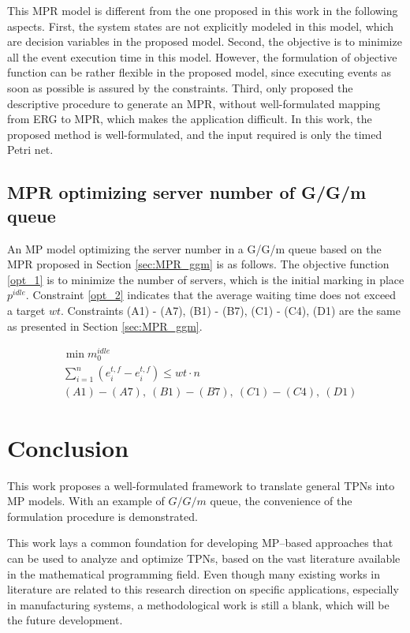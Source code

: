 \documentclass[suppldata]{interact}
\theoremstyle{plain}
\theoremstyle{definition}
\theoremstyle{remark}
\begin{document}
This MPR model is different from the one proposed in this work in the following aspects. First, the system states are not explicitly modeled in this model, which are decision variables in the proposed model. Second, the objective is to minimize all the event execution time in this model. However, the formulation of objective function can be rather flexible in the proposed model, since executing events as soon as possible is assured by the constraints. Third, \cite{chan2008optimization} only proposed the descriptive procedure to generate an MPR, without well-formulated mapping from ERG to MPR, which makes the application difficult. In this work, the proposed method is well-formulated, and the input required is only the timed Petri net.


\subsection{MPR optimizing server number of G/G/m queue}
An MP model optimizing the server number in a G/G/m queue based on the MPR proposed in Section \ref{sec:MPR_ggm} is as follows. The objective function \eqref{opt_1} is to minimize the number of servers, which is the initial marking in place $p^{idle}$. Constraint \eqref{opt_2} indicates that the average waiting time does not exceed a target $wt$. Constraints (A1) - (A7), (B1) - (B7), (C1) - (C4), (D1) are the same as presented in Section \ref{sec:MPR_ggm}.

\begin{eqnarray}
	&\min{m^{idle}_0} \label{opt_1} \\
	&\sum_{i=1}^{n} (e^{t,f}_i-e^{t,f}_i) \le wt\cdot n \label{opt_2}\\
	&(A1) - (A7),\ (B1) - (B7),\ (C1) - (C4),\ (D1) \nonumber
\end{eqnarray}

\section{Conclusion} \label{sec:conclude}
This work proposes a well-formulated framework to translate general TPNs into MP models. With an example of $G/G/m$ queue, the convenience of the formulation procedure is demonstrated.

This work lays a common foundation for developing MP--based approaches that can be used to analyze and optimize TPNs, based on the vast literature available in the mathematical programming field. Even though many existing works in literature are related to this research direction on specific applications, especially in manufacturing systems, a methodological work is still a blank, which will be the future development. 
 
\end{document}
